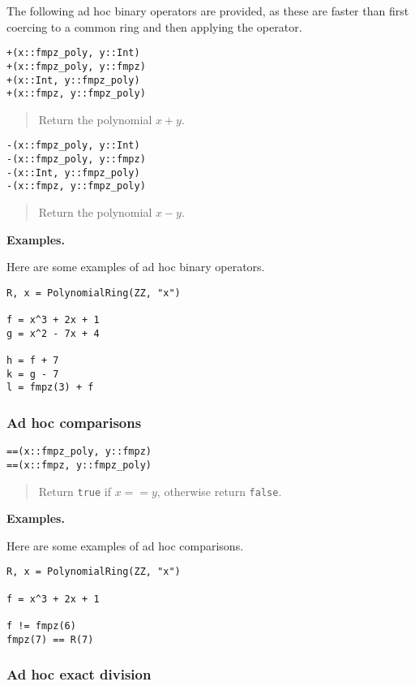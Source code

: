 \documentclass[a4paper,10pt]{article}
\newcommand{\code}{\lstinline}
\newcommand{\desc}[1]{\vspace{-3mm}\begin{quote}#1\end{quote}}
\begin{document}
{{The following ad hoc binary operators are provided, as these are faster than first coercing
to a common ring and then applying the operator.

\begin{lstlisting}
+(x::fmpz_poly, y::Int)
+(x::fmpz_poly, y::fmpz)
+(x::Int, y::fmpz_poly)
+(x::fmpz, y::fmpz_poly)
\end{lstlisting}

\desc{Return the polynomial $x + y$.}

\begin{lstlisting}
-(x::fmpz_poly, y::Int)
-(x::fmpz_poly, y::fmpz)
-(x::Int, y::fmpz_poly)
-(x::fmpz, y::fmpz_poly)
\end{lstlisting}

\desc{Return the polynomial $x - y$.}

\textbf{Examples.}

Here are some examples of ad hoc binary operators.

\begin{lstlisting}
R, x = PolynomialRing(ZZ, "x")

f = x^3 + 2x + 1
g = x^2 - 7x + 4

h = f + 7
k = g - 7
l = fmpz(3) + f
\end{lstlisting}

\subsubsection{Ad hoc comparisons}

\begin{lstlisting}
==(x::fmpz_poly, y::fmpz)
==(x::fmpz, y::fmpz_poly)
\end{lstlisting}

\desc{Return \code{true} if $x == y$, otherwise return \code{false}.}

\textbf{Examples.}

Here are some examples of ad hoc comparisons.

\begin{lstlisting}
R, x = PolynomialRing(ZZ, "x")

f = x^3 + 2x + 1

f != fmpz(6)
fmpz(7) == R(7)
\end{lstlisting}

\subsubsection{Ad hoc exact division}

}}
\end{document}
